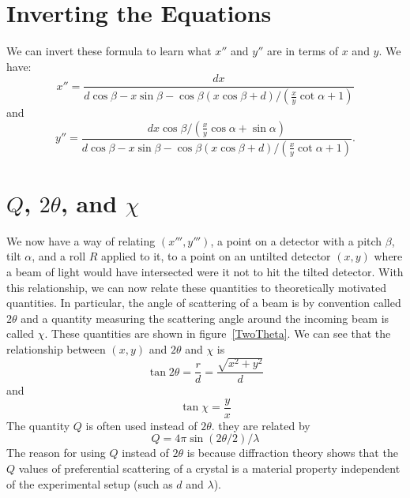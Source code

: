 \section{Inverting the Equations}

We can invert these formula to learn what
$x''$ and $y''$ are in terms of $x$ and $y$.
We have:
\begin{equation}\label{invertx}
    x''=\frac{dx}{d\cos\beta-x\sin\beta-
    \cos\beta(x\cos\beta+d)/(\tfrac{x}{y}\cot\alpha+1)}
\end{equation}
and
\begin{equation}\label{inverty}
    y''=\frac{dx\cos\beta/(\tfrac{x}{y}\cos\alpha+\sin\alpha)}
    {d\cos\beta-x\sin\beta-
    \cos\beta(x\cos\beta+d)/(\tfrac{x}{y}\cot\alpha+1)}.
\end{equation}

\section{\texorpdfstring{$Q$, $2\theta$, and $\chi$}{Q, 2theta, and chi}}

\begin{SCfigure}[1][htbp]
    \centering
    
    \caption{For a particular point $(x,y)$, we
    always associate two quantities: $2\theta$ and $\chi$.
    $2\theta$ is the angle of scattering 
    of the beam, or the angle that an incoming beam is 
    deflected by when it diffracts off the crystal. 
    $\chi$ is a measure of the azimuthal angle around 
    the beam. It tells you in what direction radially 
    outwards (with respect to the undeflected beam) 
    the outgoing beam was was scattered.}
    \label{TwoTheta}
\end{SCfigure}

We now have a way of relating $(x''',y''')$, 
a point on a detector with a pitch $\beta$, 
tilt $\alpha$, and a roll $R$ applied to it, 
to a point on an untilted detector $(x,y)$
where a beam of light would have intersected
were it not to hit the tilted detector.
With this relationship, we can now relate
these quantities to theoretically motivated 
quantities. In particular, the angle of scattering 
of a beam is by convention called $2\theta$ and a 
quantity measuring the scattering angle around the 
incoming beam is called $\chi$. These quantities 
are shown in figure~\ref{TwoTheta}. We can see that 
the relationship between $(x,y)$ and $2\theta$ and 
$\chi$ is
\begin{equation}\label{2thetatermsr}
    \tan2\theta = \frac{r}{d} = \frac{\sqrt{x^2+y^2}}{d}
\end{equation}
and
\begin{equation}\label{chitermsyx}
    \tan\chi = \frac{y}{x}
\end{equation}
The quantity $Q$ is often used instead of $2\theta$. 
they are related by
\begin{equation}\label{qterms2theta}
    Q = 4\pi \sin(2\theta/2)/\lambda
\end{equation}
The reason for using $Q$ instead of $2\theta$ is because 
diffraction theory shows that the $Q$ values of preferential 
scattering of a crystal is a material property independent 
of the experimental setup (such as $d$ and $\lambda$). 

